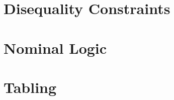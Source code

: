 \documentclass[onecolumn, 11pt, oneside, openright]{book}
\begin{document}










\part{Disequality Constraints}\label{diseqpart}






\part{Nominal Logic}\label{nominallogicpart}








\part{Tabling}\label{tablingpart}
\end{document}
